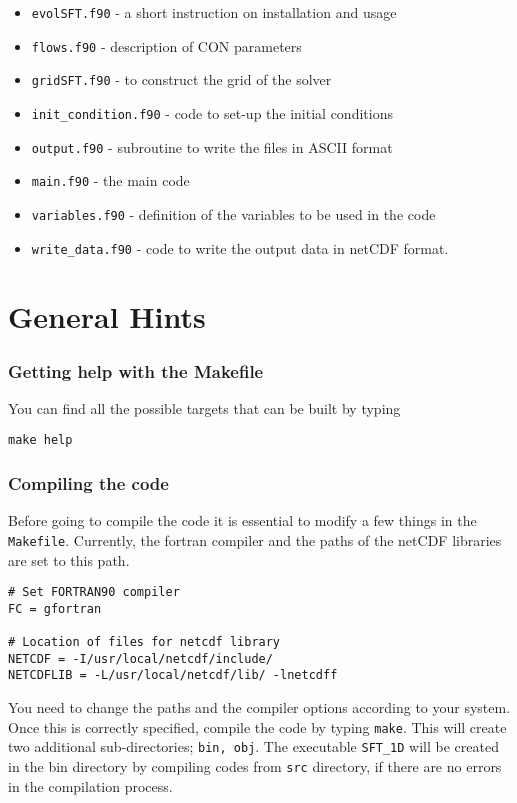 \begin{itemize}\itemsep=0pt
\item {\tt evolSFT.f90} - a short instruction on installation and usage
\item {\tt flows.f90} - description of CON parameters
\item {\tt grid\-SFT.f90} - to construct the grid of the solver
\item {\tt init\_condition.f90} - code to set-up the initial conditions
\item {\tt output.f90} - subroutine to write the files in ASCII format
\item {\tt main.f90} - the main code
\item {\tt variables.f90} - definition of the variables to be used in the code
\item {\tt write\_data.f90} - code to write the output data in netCDF format.
\end{itemize}

\section{General Hints}

\subsubsection{Getting help with the Makefile}

You can find all the possible
targets  that can be built by typing
\begin{verbatim}
make help
\end{verbatim}

\subsubsection{Compiling the code}
Before going to compile the code it is essential to modify a few things in the \texttt{Makefile}.
Currently, the fortran compiler and the paths of the netCDF libraries are set to this path.
\begin{verbatim}
# Set FORTRAN90 compiler
FC = gfortran

# Location of files for netcdf library
NETCDF = -I/usr/local/netcdf/include/
NETCDFLIB = -L/usr/local/netcdf/lib/ -lnetcdff
\end{verbatim}
You need to change the paths and the compiler options according to your system. Once this is correctly specified, compile the code by typing \texttt{make}. This will create two additional sub-directories; \texttt{bin, obj}. The executable \texttt{SFT\_1D} will be created in the bin directory by compiling codes from \texttt{src} directory, if there are no errors in the compilation process.

